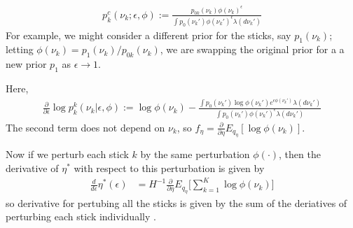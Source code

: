 \documentclass{article}
\begin{document}
\begin{align}
	\label{eq:expon_perturb}
	p^c_{k}(\nu_k ; \epsilon, \phi) :=
  \frac{p_{0k}(\nu_k)\phi(\nu_k)^\epsilon}{\int p_0(\nu_k')\phi(\nu_k')^\epsilon \lambda(d\nu_k')}
\end{align}
%
For example, we might consider a different prior for the sticks, say
$p_1(\nu_k)$; letting $\phi(\nu_k) = p_1(\nu_k) / p_{0k}(\nu_k)$, we are
swapping the original prior for a a new prior $p_1$ as $\epsilon \rightarrow 1$.

Here,
%
\begin{align}
  \frac{\partial}{\partial \epsilon} \log p_k^k(\nu_k | \epsilon, \phi) := \log \phi(\nu_k) -
    \frac{\int p_0(\nu_k')\log\phi(\nu_k')e^{\epsilon\phi(\nu_k')} \lambda(d\nu_k')}{\int p_0(\nu_k')\phi(\nu_k')^\epsilon \lambda(d\nu_k')}
\end{align}
%
The second term does not depend on $\nu_k$, so $f_\eta =
\frac{\partial}{\partial \eta} E_{q_\eta}[\log \phi(\nu_k)]$.

Now if we perturb each stick $k$ by the same perturbation $\phi(\cdot)$, then
the derivative of $\eta^*$ with respect to this perturbation is given by
%
\begin{align}
   \frac{d}{d\epsilon}\eta^*(\epsilon) &=
   H^{-1}\frac{\partial}{\partial \eta} E_{q_\eta}\Big[\sum_{k = 1}^K \log \phi(\nu_k)\Big]
  \label{eq:sensitivity_exp_pert}
\end{align}
%
so derivative for pertubing all the sticks is given by the sum of the deriatives
of perturbing each stick individually
\citep{gustafson:2012:localrobustnessbook}.
\end{document}
